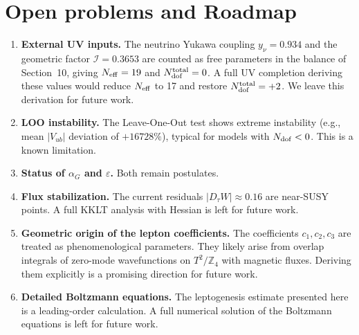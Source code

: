 \documentclass[12pt,a4paper]{article}
\numberwithin{equation}{section}
\begin{document}
\section{Open problems and Roadmap}
\begin{enumerate}[leftmargin=1.5em]
\item \textbf{External UV inputs.} The neutrino Yukawa coupling $y_\nu = 0.934$ and the geometric factor $\mathcal{I} = 0.3653$ are counted as free parameters in the balance of Section~10, giving $N_{\rm eff}=19$ and $N_{\rm dof}^{\rm total}=0$. A full UV completion deriving these values would reduce $N_{\rm eff}$ to 17 and restore $N_{\rm dof}^{\rm total}=+2$. We leave this derivation for future work.
\item \textbf{LOO instability.} The Leave-One-Out test shows extreme instability (e.g., mean \(|V_{ub}|\) deviation of \(+16728\%\)), typical for models with \(N_{\rm dof} < 0\). This is a known limitation.
\item \textbf{Status of \(\alpha_G\) and \(\varepsilon\).} Both remain postulates.
\item \textbf{Flux stabilization.} The current residuals \(|D_\tau W| \approx 0.16\) are near-SUSY points. A full KKLT analysis with Hessian is left for future work.
\item \textbf{Geometric origin of the lepton coefficients.} The coefficients \(c_1, c_2, c_3\) are treated as phenomenological parameters. They likely arise from overlap integrals of zero-mode wavefunctions on \(T^2/\mathbb{Z}_4\) with magnetic fluxes. Deriving them explicitly is a promising direction for future work.
\item \textbf{Detailed Boltzmann equations.} The leptogenesis estimate presented here is a leading-order calculation. A full numerical solution of the Boltzmann equations is left for future work.
\end{enumerate}
\end{document}
